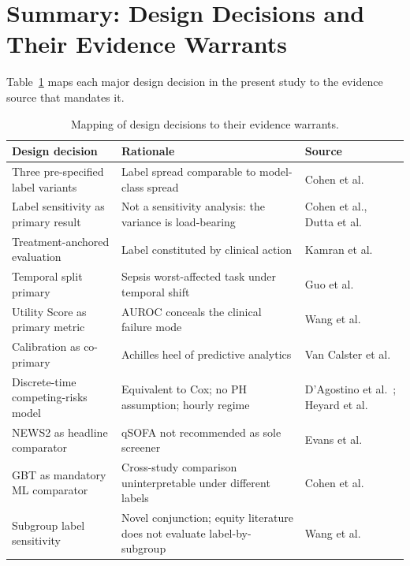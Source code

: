 \section{Summary: Design Decisions and Their Evidence Warrants}

Table~\ref{tab:design_warrant} maps each major design decision in the present
study to the evidence source that mandates it.

\begin{table}[H]
  \centering
  \small
  \begin{tabularx}{\textwidth}{p{4cm} X p{4cm}}
    \toprule
    \textbf{Design decision} & \textbf{Rationale} & \textbf{Source} \\
    \midrule
    Three pre-specified label variants & Label spread comparable to model-class
      spread & Cohen et al.\ \parencite{cohen2024subtle} \\
    Label sensitivity as primary result & Not a sensitivity analysis: the variance
      is load-bearing & Cohen et al., Dutta et al.\ \parencite{dutta2026performance} \\
    Treatment-anchored evaluation & Label constituted by clinical action &
      Kamran et al.\ \parencite{kamran2024evaluation} \\
    Temporal split primary & Sepsis worst-affected task under temporal shift &
      Guo et al.\ \parencite{guo2022temporal} \\
    Utility Score as primary metric & AUROC conceals the clinical failure mode &
      Wang et al.\ \parencite{wang2025srpm} \\
    Calibration as co-primary & Achilles heel of predictive analytics &
      Van Calster et al.\ \parencite{vancalster2019calibration} \\
    Discrete-time competing-risks model & Equivalent to Cox; no PH assumption; hourly
      regime & D'Agostino et al.\ \parencite{dagostino1990pooled}; Heyard et al.\
      \parencite{heyard2019dynamic} \\
    NEWS2 as headline comparator & qSOFA not recommended as sole screener &
      Evans et al.\ \parencite{evans2021ssc} \\
    GBT as mandatory ML comparator & Cross-study comparison uninterpretable
      under different labels & Cohen et al.\ \parencite{cohen2024subtle} \\
    Subgroup label sensitivity & Novel conjunction; equity literature does
      not evaluate label-by-subgroup & Wang et al.\ \parencite{wang2022equity} \\
    \bottomrule
  \end{tabularx}
  \caption{Mapping of design decisions to their evidence warrants.}
  \label{tab:design_warrant}
\end{table}

